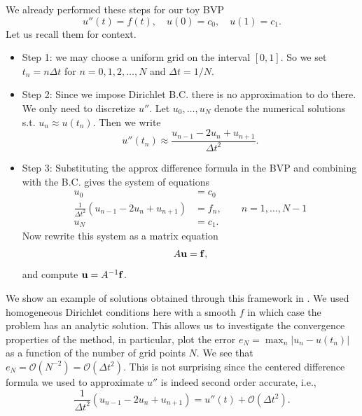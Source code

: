 \begin{example}\label{ex:l16:poisson}
    We already performed these steps for our toy BVP 
    \begin{equation*}
        u''(t) = f(t), \quad u(0) = c_0, \quad u(1) = c_1.
    \end{equation*} 
    Let us recall them for context. 
    \begin{itemize}
        \item Step 1: we may choose a uniform grid on 
        the interval $[0,1]$. So we set  
        $t_n = n \Delta t$ for $n = 0, 1, 2, \dots, N$ 
        and $\Delta t = 1/N$. 
        
        \item Step 2: Since we impose Dirichlet B.C. there is 
        no approximation to do there. We only need to 
        discretize $u''$. Let $u_0, \dots, u_N$ denote 
        the numerical solutions s.t. $u_n \approx u(t_n)$. 
        Then we write 
        \begin{equation}\label{eq:l16-poisson}
            u''(t_n) \approx \frac{u_{n-1} - 2 u_n + u_{n+1}}{\Delta t^2}.
        \end{equation} 

        \item Step 3: Substituting the approx difference formula in
        the BVP and combining with the B.C. gives the system of 
        equations 
        \begin{equation*}
            \begin{aligned}
                u_0  & = c_0 \\ 
                \frac{1}{\Delta t^2} ( u_{n-1} - 2 u_n + u_{n+1})  &= f_n, \qquad n =1, \dots, N-1 \\ 
                u_N & = c_1.
            \end{aligned}
        \end{equation*}
        Now rewrite this system as a matrix equation 
        \begin{equation*}
            A \mathbf{u} = \mathbf{f},
        \end{equation*}
        and compute $\mathbf{u} = A^{-1} \mathbf{f}$.
    \end{itemize}
    We show an example of solutions obtained through this framework 
    in . We used homogeneous 
    Dirichlet conditions here with a smooth $f$ 
    in which case the problem has an analytic solution. This 
    allows us to investigate the convergence properties of 
    the method, in particular, plot the error 
    $e_N = \max_n |u_n - u(t_n)|$ as a function of the 
    number of grid points $N$. We see that $e_N =
     \mathcal{O}(N^{-2}) = \mathcal{O}(\Delta t^2)$. 
     This is not surprising since the centered difference formula 
     we used to approximate $u''$ is indeed second order accurate, 
     i.e., 
     \begin{equation*}
        \frac{1}{\Delta t^2} (u_{n-1} - 2 u_n + u_{n+1})
        = u''(t) + \mathcal{O}(\Delta t^2).
     \end{equation*}


\end{example}
